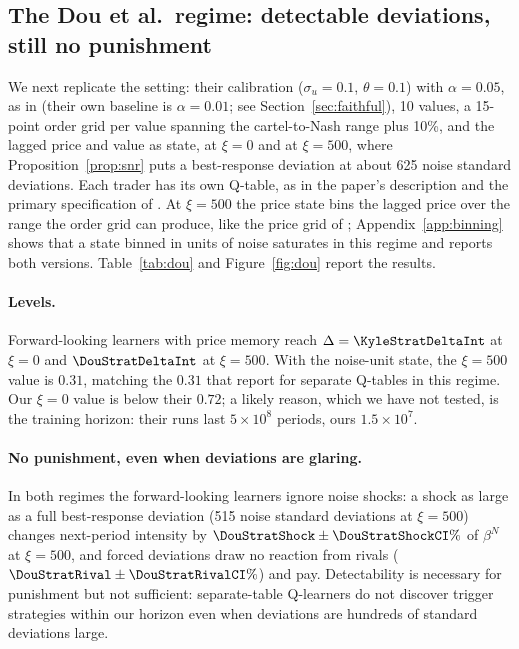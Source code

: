 \subsection{The Dou et al.\ regime: detectable deviations, still no punishment}
\label{sec:dou}

We next replicate the \citet{dou2025} setting: their calibration
($\sigma_u=0.1$, $\theta=0.1$) with $\alpha=0.05$, as in
\citet{esquinas2026} (their own baseline is $\alpha=0.01$; see
Section~\ref{sec:faithful}), 10 values, a 15-point order grid
per value spanning the cartel-to-Nash range plus 10\%, and the lagged price and
value as state, at $\xi=0$ and at $\xi=500$, where Proposition~\ref{prop:snr}
puts a best-response deviation at about 625 noise standard deviations. Each
trader has its own Q-table, as in the paper's description and the primary
specification of \citet{esquinas2026}. At $\xi=500$ the price state bins the
lagged price over the range the order grid can produce, like the price grid
of \citet{dou2025}; Appendix~\ref{app:binning} shows that a state binned in
units of noise saturates in this regime and reports both versions.
Table~\ref{tab:dou} and Figure~\ref{fig:dou} report the results.

\paragraph{Levels.} Forward-looking learners with price memory reach
$\Delta=\KyleStratDeltaInt$ at $\xi=0$ and $\DouStratDeltaInt$ at $\xi=500$. With
the noise-unit state, the $\xi=500$ value is $0.31$, matching the $0.31$ that
\citet{esquinas2026} report for separate Q-tables in this regime. Our $\xi=0$
value is below their $0.72$; a likely reason, which we have not tested, is the
training horizon: their runs last $5\times10^8$ periods, ours $1.5\times10^7$.

\paragraph{No punishment, even when deviations are glaring.} In both regimes
the forward-looking learners ignore noise shocks: a shock as large as a full
best-response deviation (515 noise standard deviations at $\xi=500$) changes
next-period intensity by $\DouStratShock\pm\DouStratShockCI\%$ of $\beta^N$ at
$\xi=500$, and forced deviations draw no reaction from rivals
($\DouStratRival\pm\DouStratRivalCI\%$) and pay. Detectability is necessary
for punishment but not sufficient: separate-table Q-learners do not discover
trigger strategies within our horizon even when deviations are hundreds of
standard deviations large.

